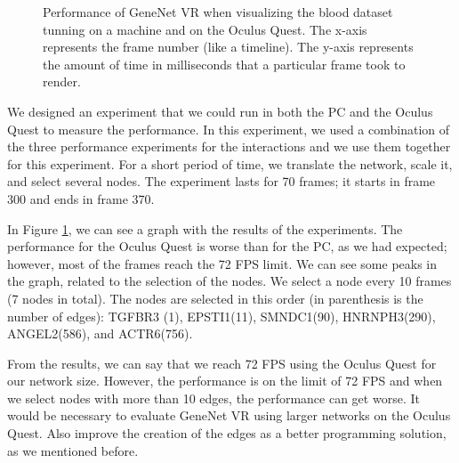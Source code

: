 \begin{figure}[h!]
  \centering
  \begin{minipage}{.8\textwidth}
  \end{minipage}
\caption{Performance of GeneNet VR when visualizing the blood dataset tunning on a machine and on the Oculus Quest. The x-axis represents the frame number (like a timeline). The y-axis represents the amount of time in milliseconds that a particular frame took to render.}
\label{fig:pc_vs_oculus}
\end{figure}

We designed an experiment that we could run in both the PC and the Oculus Quest to measure the performance. In this experiment, we used a combination of the three performance experiments for the interactions and we use them together for this experiment. For a short period of time, we translate the network, scale it, and select several nodes. The experiment lasts for 70 frames; it starts in frame 300 and ends in frame 370.

In Figure \ref{fig:pc_vs_oculus}, we can see a graph with the results of the experiments. The performance for the Oculus Quest is worse than for the PC, as we had expected; however, most of the frames reach the 72 FPS limit. We can see some peaks in the graph, related to the selection of the nodes. We select a node every 10 frames (7 nodes in total). The nodes are selected in this order (in parenthesis is the number of edges): TGFBR3 (1), EPSTI1(11), SMNDC1(90), HNRNPH3(290), ANGEL2(586), and ACTR6(756).

From the results, we can say that we reach 72 FPS using the Oculus Quest for our network size. However, the performance is on the limit of 72 FPS and when we select nodes with more than 10 edges, the performance can get worse. It would be necessary to evaluate GeneNet VR using larger networks on the Oculus Quest. Also improve the creation of the edges as a better programming solution, as we mentioned before.

